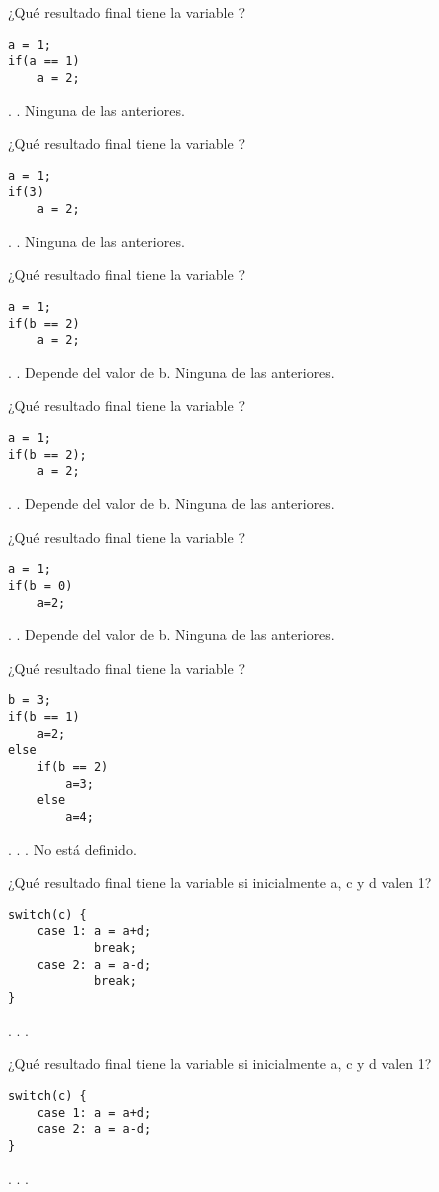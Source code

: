
\begin{preguntas}
\label{tc-control-preg}
\question ¿Qué resultado final tiene la variable ?
\begin{lstlisting}
a = 1; 
if(a == 1)
	a = 2;
\end{lstlisting}
.
.
\choice Ninguna de las anteriores.

\question ¿Qué resultado final tiene la variable ?
\begin{lstlisting}
a = 1; 
if(3)
	a = 2;
\end{lstlisting}
.
.
\choice Ninguna de las anteriores.

\question ¿Qué resultado final tiene la variable ?
\begin{lstlisting}
a = 1;
if(b == 2)
	a = 2;
\end{lstlisting}
.
.
\correctchoice Depende del valor de b.
\choice Ninguna de las anteriores.

\question ¿Qué resultado final tiene la variable ?
\begin{lstlisting}
a = 1;
if(b == 2);
	a = 2;
\end{lstlisting}
.
.
\choice Depende del valor de b.
\choice Ninguna de las anteriores.

\question ¿Qué resultado final tiene la variable ?
\begin{lstlisting}
a = 1;
if(b = 0)
    a=2;
\end{lstlisting}
.
.
\choice Depende del valor de b.
\choice Ninguna de las anteriores.

\question ¿Qué resultado final tiene la variable ?
\begin{lstlisting}
b = 3;
if(b == 1)
	a=2;
else 
	if(b == 2)
	 	a=3; 
	else 
		a=4;
\end{lstlisting}
. 
.
.
\choice No está definido.

\question ¿Qué resultado final tiene la variable  si inicialmente a, c y d valen 1?
\begin{lstlisting}
switch(c) {
	case 1: a = a+d;  
		    break;
	case 2: a = a-d;
			break;
}
\end{lstlisting}
.
.
.

\question ¿Qué resultado final tiene la variable  si inicialmente a, c y d valen 1?
\begin{lstlisting}
switch(c) {
	case 1: a = a+d;  
	case 2: a = a-d;
}
\end{lstlisting}
.
.
.


\end{preguntas}
